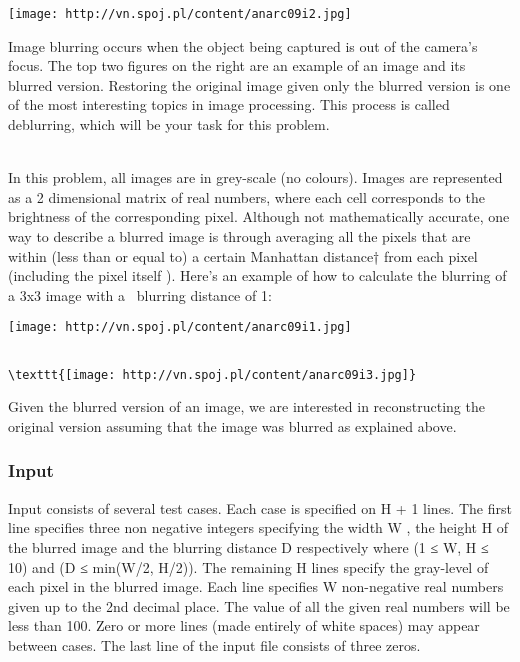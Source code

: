 




\texttt{[image: http://vn.spoj.pl/content/anarc09i2.jpg]}

   Image blurring occurs when the object being captured is out of the camera’s focus. The top two figures on the right are an example of an image and its blurred version. Restoring the original image given only the blurred version is one of the most interesting topics in image processing. This process is called deblurring, which will be your task for this problem.  


\\   In this problem, all images are in grey-scale (no colours). Images are represented as a 2 dimensional matrix of real numbers, where each cell corresponds to the  brightness of the corresponding pixel. Although not mathematically accurate, one way to describe a blurred image is through averaging all the pixels that are within (less than or equal to) a certain Manhattan distance† from each pixel (including the pixel itself ). Here’s an example of how to calculate the blurring of a 3x3 image with a  blurring distance of 1:  


\texttt{[image: http://vn.spoj.pl/content/anarc09i1.jpg]}
\begin{verbatim}

\texttt{[image: http://vn.spoj.pl/content/anarc09i3.jpg]}\end{verbatim}

   Given the blurred version of an image, we are interested in reconstructing the original version assuming that the image was blurred as explained above.  

\subsubsection{   Input  }

   Input consists of several test cases. Each case is specified on H + 1 lines. The first line specifies three non negative integers specifying the width W , the height H of the blurred image and the blurring distance D respectively where (1 ≤ W, H ≤ 10) and (D ≤ min(W/2, H/2)). The remaining H lines specify the gray-level of each pixel in the blurred image. Each line specifies W non-negative real numbers given up to the 2nd decimal place. The value of all the given real numbers will be less than 100. Zero or more lines (made entirely of white spaces) may appear between cases. The last line of the input file consists of three zeros.  

